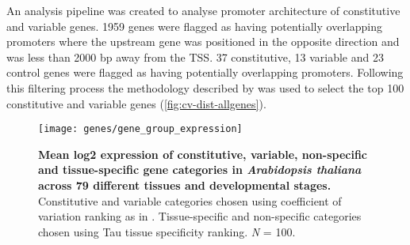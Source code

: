 \documentclass[../main.tex]{subfiles}
\begin{document}
An analysis pipeline was created to analyse promoter architecture of constitutive and variable genes.
1959 genes were flagged as having potentially overlapping promoters where the upstream gene was positioned in the opposite direction and was less than 2000 bp away from the TSS.
37 constitutive, 13 variable and 23 control genes were flagged as having potentially overlapping promoters.
Following this filtering process the methodology described by \textcite{czechowskiGenomeWideIdentificationTesting2005} was used to select the top 100 constitutive and variable genes (\autoref{fig:cv-dist-allgenes}).


\begin{figure}[hbt!]
	\begin{center}
		\capstart
		\texttt{[image: genes/gene\_group\_expression]}
		\caption{
			\textbf{Mean log2 expression of constitutive, variable, non\hyp{}specific and tissue\hyp{}specific gene categories in \textit{Arabidopsis thaliana} across 79 different tissues and developmental stages.}
			Constitutive and variable categories chosen using coefficient of variation ranking as in \textcite{czechowskiGenomeWideIdentificationTesting2005}.
			Tissue\hyp{}specific and non\hyp{}specific categories chosen using Tau tissue specificity ranking. \textit{N} = 100.				
			\label{fig:gene_group_expression}
		}
	\end{center}
\end{figure}
\end{document}
